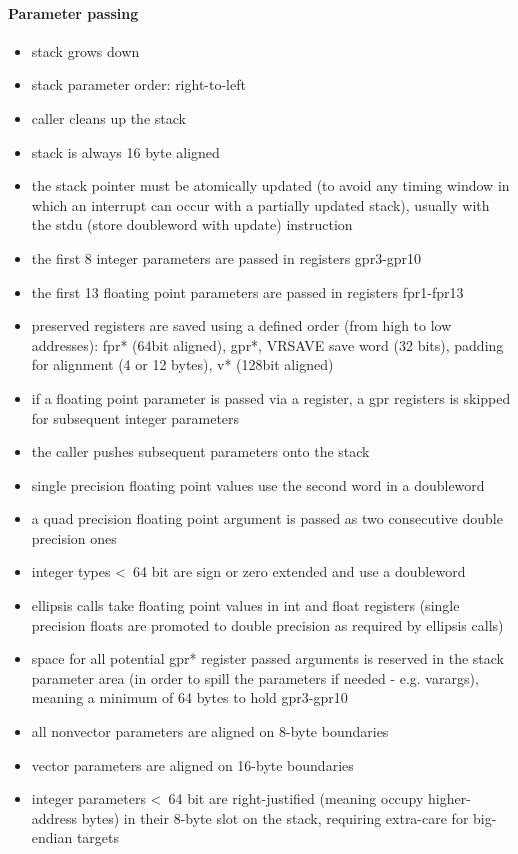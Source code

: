 \paragraph{Parameter passing}

\begin{itemize}
\item stack grows down
\item stack parameter order: right-to-left
\item caller cleans up the stack
\item stack is always 16 byte aligned
\item the stack pointer must be atomically updated (to avoid any timing window in which an interrupt can occur with a partially updated stack), usually with the stdu (store doubleword with update) instruction
\item the first 8 integer parameters are passed in registers gpr3-gpr10
\item the first 13 floating point parameters are passed in registers fpr1-fpr13
\item preserved registers are saved using a defined order (from high to low addresses):
 fpr* (64bit aligned),
 gpr*,
 VRSAVE save word (32 bits),
 padding for alignment (4 or 12 bytes),
 v* (128bit aligned)
\item if a floating point parameter is passed via a register, a gpr registers is skipped for subsequent integer parameters
\item the caller pushes subsequent parameters onto the stack
\item single precision floating point values use the second word in a doubleword 
\item a quad precision floating point argument is passed as two consecutive double precision ones
\item integer types \textless\ 64 bit are sign or zero extended and use a doubleword
\item ellipsis calls take floating point values in int and float registers (single precision floats are promoted to double precision as
required by ellipsis calls)
\item space for all potential gpr* register passed arguments is reserved in the stack parameter area (in order to spill the parameters if
needed - e.g. varargs), meaning a minimum of 64 bytes to hold gpr3-gpr10
\item all nonvector parameters are aligned on 8-byte boundaries
\item vector parameters are aligned on 16-byte boundaries
\item integer parameters \textless\ 64 bit are right-justified (meaning occupy higher-address bytes) in their 8-byte slot on the stack, requiring extra-care for big-endian targets
\end{itemize}


